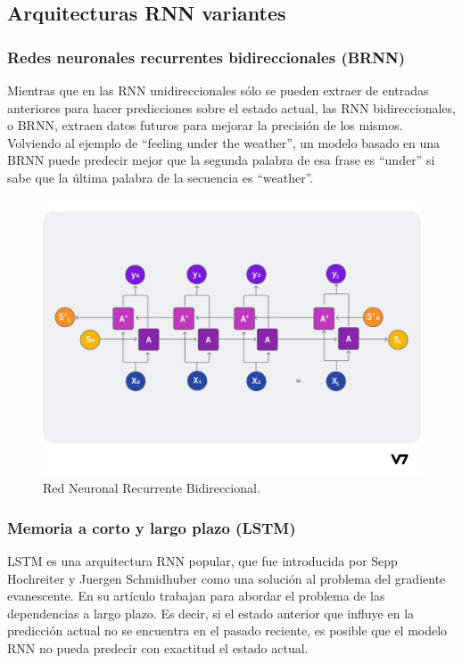 \documentclass{article}
\begin{document}
\subsection{Arquitecturas RNN variantes}
\subsubsection{Redes neuronales recurrentes bidireccionales (BRNN)}
Mientras que en las RNN unidireccionales sólo se pueden extraer de entradas anteriores para hacer predicciones sobre el estado actual, las RNN bidireccionales, o BRNN, extraen datos futuros para mejorar la precisión de los mismos. Volviendo al ejemplo de ``feeling under the weather'', un modelo basado en una BRNN puede predecir mejor que la segunda palabra de esa frase es ``under'' si sabe que la última palabra de la secuencia es ``weather''.

\begin{figure}[H]
    \centering
    \includegraphics[scale=0.25]{brnn.png}
    \caption{Red Neuronal Recurrente Bidireccional.}
\end{figure}

\newpage

\subsubsection{Memoria a corto y largo plazo (LSTM)}
LSTM es una arquitectura RNN popular, que fue introducida por Sepp Hochreiter y Juergen Schmidhuber como una solución al problema del gradiente evanescente. En su artículo \cite{lstmpaper} trabajan para abordar el problema de las dependencias a largo plazo. Es decir, si el estado anterior que influye en la predicción actual no se encuentra en el pasado reciente, es posible que el modelo RNN no pueda predecir con exactitud el estado actual. \\
\end{document}
